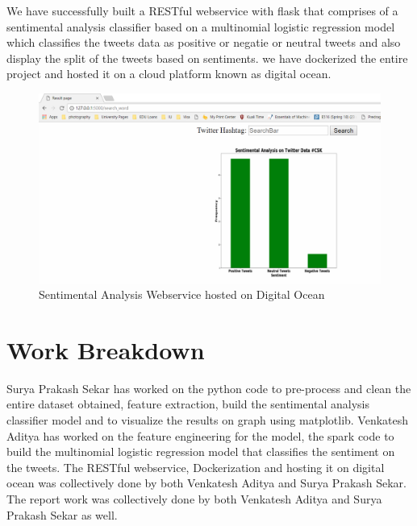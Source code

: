 We have successfully built a RESTful webservice with flask that
comprises of a sentimental analysis classifier based on a multinomial
logistic regression model which classifies the tweets data as positive
or negatie or neutral tweets and also display the split of the tweets
based on sentiments.  we have dockerized the entire project and hosted
it on a cloud platform known as digital ocean.

\begin{figure}[!ht]
\centering\includegraphics[width=\columnwidth]{images/result.png}
\caption{Sentimental Analysis Webservice hosted on Digital Ocean}
\label{f:Sentimental Analysis Webservice }
\end{figure}


\section{Work Breakdown}
Surya Prakash Sekar has worked on the python code to pre-process and
clean the entire dataset obtained, feature extraction, build the
sentimental analysis classifier model and to visualize the results on
graph using matplotlib. Venkatesh Aditya has worked on the feature
engineering for the model, the spark code to build the multinomial
logistic regression model that classifies the sentiment on the tweets.
The RESTful webservice, Dockerization and hosting it on digital ocean
was collectively done by both Venkatesh Aditya and Surya Prakash
Sekar.  The report work was collectively done by both Venkatesh Aditya
and Surya Prakash Sekar as well.

